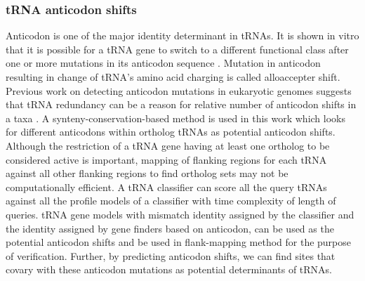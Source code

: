 \documentclass[
10pt, %
a4paper, %
oneside, %
headinclude,footinclude, %
BCOR5mm, %
]{scrartcl}
\begin{document}

\subsubsection*{tRNA anticodon shifts}
Anticodon is one of the major identity determinant in tRNAs. It is shown in vitro that it is possible for a tRNA gene to switch to a different functional class after one or more mutations in its anticodon sequence \cite{shifts1,shifts2}. Mutation in anticodon resulting in change of tRNA’s amino acid charging is called alloaccepter shift. Previous work on detecting anticodon mutations in eukaryotic genomes suggests that tRNA redundancy can be a reason for relative number of anticodon shifts in a taxa \cite{Rogers2014tRNAAS}. A synteny-conservation-based method is used in this work which looks for different anticodons within ortholog tRNAs as potential anticodon shifts. Although the restriction of a tRNA gene having at least one ortholog to be considered active is important, mapping of flanking regions for each tRNA against all other flanking regions to find ortholog sets may not be computationally efficient. A tRNA classifier can score all the query tRNAs against all the profile models of a classifier with time complexity of length of queries. tRNA gene models with mismatch identity assigned by the classifier and the identity assigned by gene finders based on anticodon, can be used as the potential anticodon shifts and be used in flank-mapping method for the purpose of verification. Further, by predicting anticodon shifts, we can find sites that covary with these anticodon mutations as potential determinants of tRNAs.
\end{document}
